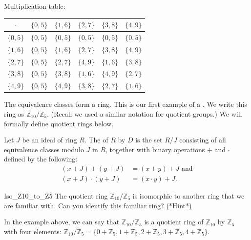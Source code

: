 \begin{example}{}
Multiplication table:

\begin{center}
\begin{tabular}{c|c|c|c|c|c}
$\cdot$ & $\{0,5\}$ & $\{1,6\}$ & $\{2,7\}$ & $\{3,8\}$ & $\{4,9\}$ \\
\hline
$\{0,5\}$ & $\{0,5\}$ & $\{0,5\}$ & $\{0,5\}$ & $\{0,5\}$ & $\{0,5\}$ \\
\hline
$\{1,6\}$ & $\{0,5\}$ & $\{1,6\}$ & $\{2,7\}$ & $\{3,8\}$ & $\{4,9\}$ \\
\hline
$\{2,7\}$ & $\{0,5\}$ & $\{2,7\}$ & $\{4,9\}$ & $\{1,6\}$ & $\{3,8\}$ \\
\hline
$\{3,8\}$ & $\{0,5\}$ & $\{3,8\}$ & $\{1,6\}$ & $\{4,9\}$ & $\{2,7\}$ \\
\hline
$\{4,9\}$ & $\{0,5\}$ & $\{4,9\}$ & $\{3,8\}$ & $\{2,7\}$ & $\{1,6\}$ \\
\end{tabular}
\end{center}
\end{example}

The equivalence classes form a ring.  This is our first example of a .  We write this ring as ${\mathbb Z}_{10}/{\mathbb Z}_5$.  (Recall we used a similar notation for quotient groups.)  We will formally define quotient rings below.

\begin{defn}\label{quotient ring}
Let $J$ be an ideal of ring $R$.  The  of $R$ by $D$ is the set $R/J$ consisting of all equivalence classes modulo $J$ in $R$, together with binary operations $+$ and $\cdot$ defined by the following:
\begin{align*}
(x+J)+(y+J)&=(x+y)+J \text{ and}\\
(x+J)\cdot(y+J)&=(x\cdot y)+J.
\end{align*}
\end{defn}

\begin{exercise}{Iso_Z10_to_Z5}
The quotient ring ${\mathbb Z}_{10}/{\mathbb Z}_5$ is isomorphic to another ring that we are familiar with. Can you identify this familiar ring?  \hyperref[ringsHints]{(*Hint*)} 
\end{exercise}

In the example above, we can say that ${\mathbb Z}_{10}/{\mathbb Z}_5$ is a quotient ring of ${\mathbb Z}_{10}$ by ${\mathbb Z}_5$ with four elements:
${\mathbb Z}_{10}/{\mathbb Z}_5=\{0+{\mathbb Z}_5, 1+{\mathbb Z}_5, 2+{\mathbb Z}_5, 3+{\mathbb Z}_5, 4+{\mathbb Z}_5\}$.

